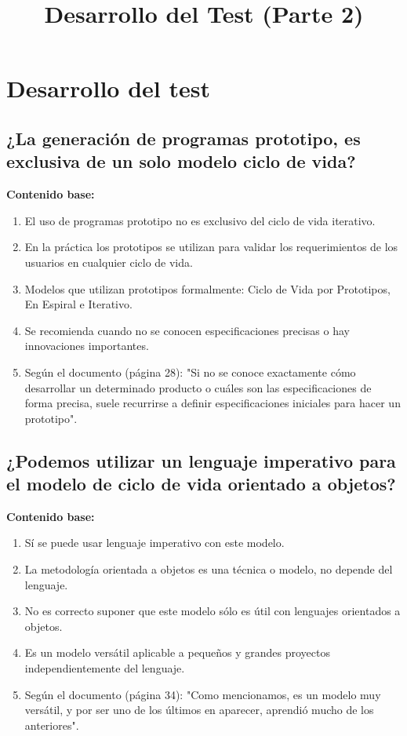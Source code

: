 \documentclass{article}
\title{Desarrollo del Test (Parte 2)}
\author{}
\date{}
\begin{document}
\maketitle

\section{Desarrollo del test}

\subsection{¿La generación de programas prototipo, es exclusiva de un solo modelo ciclo de vida?}

\begin{framed}
\noindent\textbf{Contenido base:}
\begin{enumerate}
    \item El uso de programas prototipo no es exclusivo del ciclo de vida iterativo.
    \item En la práctica los prototipos se utilizan para validar los requerimientos de los usuarios en cualquier ciclo de vida.
    \item Modelos que utilizan prototipos formalmente: Ciclo de Vida por Prototipos, En Espiral e Iterativo.
    \item Se recomienda cuando no se conocen especificaciones precisas o hay innovaciones importantes.
    \item Según el documento (página 28): "Si no se conoce exactamente cómo desarrollar un determinado producto o cuáles son las especificaciones de forma precisa, suele recurrirse a definir especificaciones iniciales para hacer un prototipo".
\end{enumerate}
\end{framed}

\subsection{¿Podemos utilizar un lenguaje imperativo para el modelo de ciclo de vida orientado a objetos?}

\begin{framed}
\noindent\textbf{Contenido base:}
\begin{enumerate}
    \item Sí se puede usar lenguaje imperativo con este modelo.
    \item La metodología orientada a objetos es una técnica o modelo, no depende del lenguaje.
    \item No es correcto suponer que este modelo sólo es útil con lenguajes orientados a objetos.
    \item Es un modelo versátil aplicable a pequeños y grandes proyectos independientemente del lenguaje.
    \item Según el documento (página 34): "Como mencionamos, es un modelo muy versátil, y por ser uno de los últimos en aparecer, aprendió mucho de los anteriores".
\end{enumerate}
\end{framed}
\end{document}
